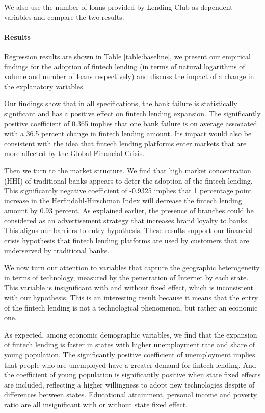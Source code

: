 \documentclass[11pt, a4paper, leqno]{article}
\begin{document}
We also use the number of loans provided by Lending Club as dependent variables and compare the two results.

\paragraph{Results}
Regression results are shown in Table \ref{table:baseline}, we present our empirical findings for the adoption of fintech lending (in terms of natural logarithms of volume and number of loans respectively) and discuss the impact of a change in the explanatory variables. 

Our findings show that in all specifications, the bank failure is statistically significant and has a positive effect on fintech lending expansion. The significantly positive coefficient of 0.365 implies that one bank failure is on average associated with a 36.5 percent change in fintech lending amount. Its impact would also be consistent with the idea that fintech lending platforms enter markets that are more affected by the Global Financial Crisis.

Then we turn to the market structure. We find that high market concentration (HHI) of traditional banks appears to deter the adoption of the fintech lending. This significantly negative coefficient of -0.9325 implies that 1 percentage point increase in the Herfindahl-Hirschman Index will decrease the fintech lending amount by 0.93 percent. As explained earlier, the presence of branches could be considered as an advertisement strategy that increases brand loyalty to banks. This aligns our barriers to entry hypothesis. These results support our financial crisis hypothesis that fintech lending platforms are used by customers that are underserved by traditional banks. 

We now turn our attention to variables that capture the geographic heterogeneity in terms of technology, measured by the penetration of Internet by each state. This variable is insignificant with and without fixed effect, which is inconsistent with our hypothesis. This is an interesting result because it means that the entry of the fintech lending is not a technological phenomenon, but rather an economic one. 

As expected, among economic demographic variables, we find that the expansion of fintech lending is faster in states with higher unemployment rate and share of young population. The significantly positive coefficient of unemployment implies that people who are unemployed have a greater demand for fintech lending. And the coefficient of young population is significantly positive when state fixed effects are included, reflecting a higher willingness to adopt new technologies despite of differences between states. Educational attainment, personal income and poverty ratio are all insignificant with or without state fixed effect.
\end{document}
